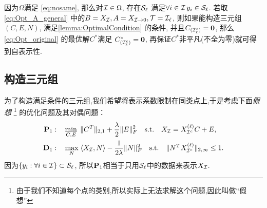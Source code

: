 因为\(\Omega\)满足 \eqref{eq:nosame},    那么对\(\mathcal{I}\in \Omega\),
存在\(\mathcal{S}_\ell\) 满足\( \forall i \in \mathcal{I} \, y_i \in \mathcal{S}_\ell\). 
若取 \eqref{eq:Opt_A_general} 中的\(B=X_{\mathcal{I}}, A=X_{\mathcal{I}\rightarrow 0}, \mathcal{T}=\mathcal{I}_\ell\),
则如果能构造三元组\((C,E,N)\), 满足\autoref{lemma:OptimalCondition} 的条件,
并且\(C_{(\mathcal{I}_\ell^c)}=\mathbf{0}\), 那么 \eqref{eq:Opt_original} 的最优解\(C^*\)满足
\(C^*_{(\mathcal{I}_\ell^c)}=\mathbf{0}\), 再保证\(C^*\)非平凡(不全为零)就可得到自表示性.

\subsection{构造三元组}\label{sec:construct_nu}
为了构造满足条件的三元组,我们希望将表示系数限制在同类点上,于是考虑下面\emph{假想}
\footnote{由于我们不知道每个点的类别,所以实际上无法求解这个问题,因此叫做``假想''}
的优化问题及其对偶问题：
\begin{align}\label{eq:Opt_fictitious2}
  \mathbf{P}_1: \quad &\min_{C, E} \;
  \|C^T\|_{2,1}+\frac{\lambda}{2}\|E\|_F^2 \quad
  \text{s.t.} \quad X_{\mathcal{I}}=X^{(\ell)}_{\mathcal{I}^c}C+E,\\
  \mathbf{D}_1: \quad &\max_{N} \; \langle X_{\mathcal{I}}, N\rangle -
  \frac{1}{2\lambda} \|N\|_F^2 \quad
  \text{s.t.} \quad \|N^T X^{(\ell)}_{\mathcal{I}^c}\|_{2, \infty} \leq 1.
  \label{eq:dual_fictitious2}
\end{align}
因为\(\left\{y_i : \forall i \in \mathcal{I} \right\}\subset \mathcal{S}_\ell\),
所以\(\mathbf{P}_1\)相当于只用\(\mathcal{S}_\ell\)中的数据来表示\(X_{\mathcal{I}}\).

